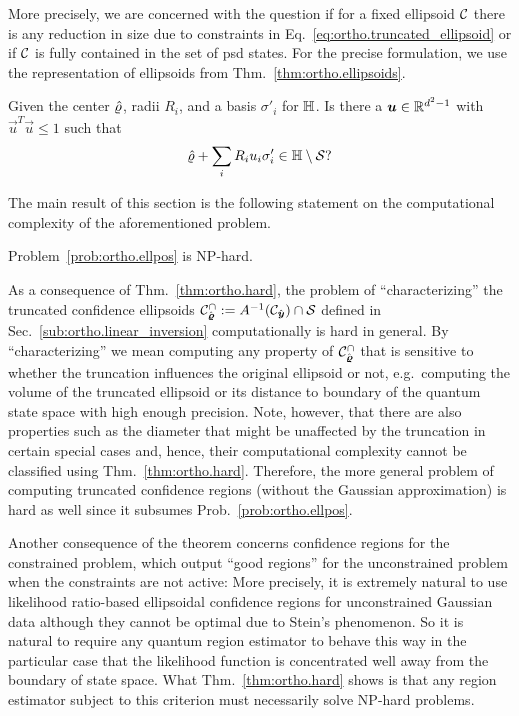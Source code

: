 More precisely, we are concerned with the question if for a fixed ellipsoid $\mathcal{C}$ there is any reduction in size due to constraints in Eq.~\eqref{eq:ortho.truncated_ellipsoid} or if $\mathcal{C}$ is fully contained in the set of psd states.
For the precise formulation, we use the representation of ellipsoids from Thm.~\ref{thm:ortho.ellipsoids}.
\begin{problem}\label{prob:ortho.ellpos}
  Given the center $\hat{\varrho}$, radii $R_i$, and a basis $\sigma'_i$ for $\mathbb{H}$.
  Is there a $\boldsymbol{u} \in \mathbb{R}^{d^2 - 1}$ with $\vec{u}^{T}\vec{u} \leq 1$ such that
  \[
    \hat{\varrho} + \sum_{i}R_{i}u_{i}\sigma_{i}' \in \mathbb{H} \setminus \mathcal{S}?
  \]
\end{problem}
The main result of this section is the following statement on the computational complexity of the aforementioned problem.
\begin{theorem}\label{thm:ortho.hard}
  Problem~\ref{prob:ortho.ellpos} is NP-hard.
\end{theorem}
As a consequence of Thm.~\ref{thm:ortho.hard}, the problem of ``characterizing'' the truncated confidence ellipsoids $\mathcal{C}_{\hat{\boldsymbol{\varrho}}}^\cap := A^{-1}(\mathcal{C}_{\hat{\boldsymbol{y}}}) \cap \mathcal{S}$ defined in Sec.~\ref{sub:ortho.linear_inversion} computationally is hard in general.
By ``characterizing'' we mean computing any property of $\mathcal{C}_{\hat{\boldsymbol{\varrho}}}^\cap$ that is sensitive to whether the truncation influences the original ellipsoid or not, e.g.\ computing the volume of the truncated ellipsoid or its distance to boundary of the quantum state space with high enough precision.
Note, however, that there are also properties such as the diameter that might be unaffected by the truncation in certain special cases and, hence, their computational complexity cannot be classified using Thm.~\ref{thm:ortho.hard}.
Therefore, the more general problem of computing truncated confidence regions (without the Gaussian approximation) is hard as well since it subsumes Prob.~\ref{prob:ortho.ellpos}.

Another consequence of the theorem concerns confidence regions for the constrained problem, which output ``good regions'' for the unconstrained problem when the constraints are not active:
More precisely, it is extremely natural to use likelihood ratio-based ellipsoidal confidence regions for unconstrained Gaussian data although they cannot be optimal due to Stein's phenomenon.
So it is natural to require any quantum region estimator to behave this way in the particular case that the likelihood function is concentrated well away from the boundary of state space.
What Thm.~\ref{thm:ortho.hard} shows is that any region estimator subject to this criterion must necessarily solve NP-hard problems.\\


